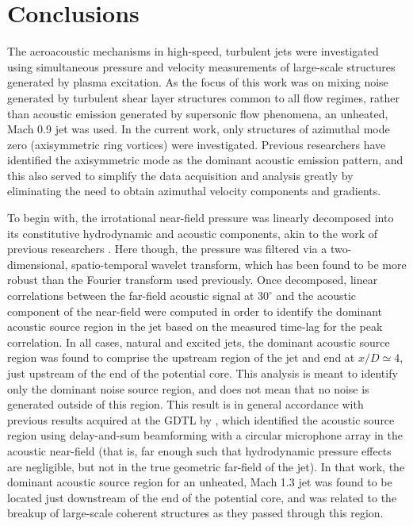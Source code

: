 \section{Conclusions}
The aeroacoustic mechanisms in high-speed, turbulent jets were investigated using simultaneous pressure and velocity measurements of large-scale structures generated by plasma excitation.
As the focus of this work was on mixing noise generated by turbulent shear layer structures common to all flow regimes, rather than acoustic emission generated by supersonic flow phenomena, an unheated, Mach 0.9 jet was used.
In the current work, only structures of azimuthal mode zero (axisymmetric ring vortices) were investigated. Previous researchers have identified the axisymmetric mode as the dominant acoustic emission pattern, and this also served to simplify the data acquisition and analysis greatly by eliminating the need to obtain azimuthal velocity components and gradients.

To begin with, the irrotational near-field pressure was linearly decomposed into its constitutive hydrodynamic and acoustic components, akin to the work of previous researchers \citep{Tinney2008}.
Here though, the pressure was filtered via a two-dimensional, spatio-temporal wavelet transform, which has been found to be more robust than the Fourier transform used previously.
Once decomposed, linear correlations between the far-field acoustic signal at $30^\circ$ and the acoustic component of the near-field were computed in order to identify the dominant acoustic source region in the jet based on the measured time-lag for the peak correlation.
In all cases, natural and excited jets, the dominant acoustic source region was found to comprise the upstream region of the jet and end at $x/D \simeq 4$, just upstream of the end of the potential core.
This analysis is meant to identify only the dominant noise source region, and does not mean that no noise is generated outside of this region.
This result is in general accordance with previous results acquired at the GDTL by \citet{Hileman2005}, which identified the acoustic source region using delay-and-sum beamforming with a circular microphone array in the acoustic near-field (that is, far enough such that hydrodynamic pressure effects are negligible, but not in the true geometric far-field of the jet).
In that work, the dominant acoustic source region for an unheated, Mach 1.3 jet was found to be located just downstream of the end of the potential core, and was related to the breakup of large-scale coherent structures as they passed through this region.

